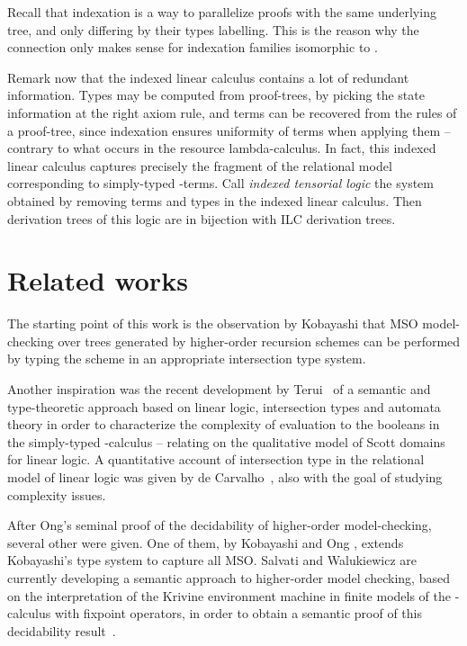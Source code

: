 \documentclass{eptcs}
\begin{document}
Recall that indexation is a way to parallelize proofs with the same underlying tree, and only differing by their types labelling. This is the reason why the connection only makes sense for indexation families isomorphic to .

Remark now that the indexed linear calculus contains a lot of redundant information. Types may be computed from proof-trees, by picking the state information at the right axiom rule, and terms can be recovered from the rules of a proof-tree, since indexation ensures uniformity of terms when applying them -- contrary to what occurs in the resource lambda-calculus. In fact, this indexed linear calculus captures precisely the fragment of the relational model corresponding to simply-typed -terms. Call \emph{indexed tensorial logic} the system obtained by removing terms and types in the indexed linear calculus. Then derivation trees of this logic are in bijection with ILC derivation trees.



\section{Related works}\label{section/related-works}
The starting point of this work is the observation by Kobayashi \cite{koba09} that MSO model-checking over trees generated by higher-order recursion schemes can be performed by typing the scheme in an appropriate intersection type system.

Another inspiration was the recent development by Terui~\cite{terui} of a semantic and type-theoretic approach 
based on linear logic, intersection types and automata theory
in order to characterize the complexity of evaluation to the booleans
in the simply-typed -calculus -- relating on the qualitative model of Scott domains for linear logic. A quantitative account of intersection type in the relational model of linear logic was given by de Carvalho~\cite{carvalho}, also with the goal of studying complexity issues.

After Ong's seminal proof \cite{ong} of the decidability of higher-order model-checking, several other were given. One of them, by Kobayashi and Ong \cite{kobayashi-ong}, extends Kobayashi's type system to capture all MSO. Salvati and Walukiewicz are currently developing
a semantic approach to higher-order model checking, based on the interpretation
of the Krivine environment machine in finite models of the -calculus 
with fixpoint operators, in order to obtain a semantic proof of this decidability result~\cite{salvati,salvati2}.
\end{document}
